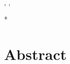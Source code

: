\documentclass[10pt,a4paper]{article}
\begin{document}
\vspace*{0.2in}


\begin{flushleft}
{\Large
\textbf\newline{
\Title
} %
}
\newline
\\
\AuthorED, %
\AuthorPA, %
\AuthorLP%
\\
\bigskip
\Address
\bigskip

%
%





* \EmailLP

\end{flushleft}
\section*{Abstract}
\Abstract
\end{document}
